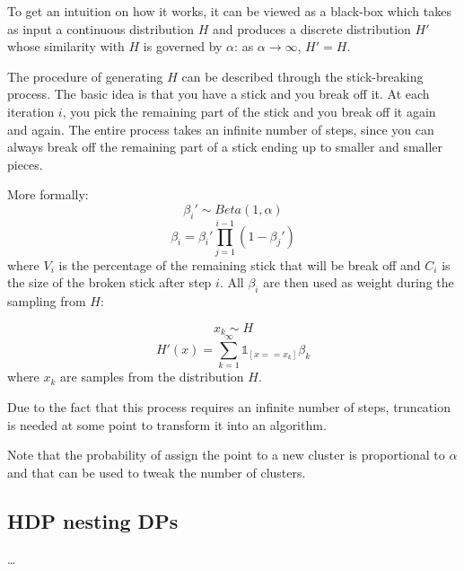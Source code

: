 To get an intuition on how it works, it can be viewed as a black-box
which takes as input a continuous distribution $H$ and produces a discrete distribution $H'$
whose similarity with $H$ is governed by $\alpha$: as $\alpha \to \infty$, $H' = H$.

The procedure of generating $H$ can be described through the stick-breaking process.
The basic idea is that you have a stick and you break off it.
At each iteration $i$, you pick the remaining part of the stick and you break off it again and again.
The entire process takes an infinite number of steps, since you can always break off the remaining part
of a stick ending up to smaller and smaller pieces.

More formally:
\begin{equation*}
    \beta_i' \sim Beta(1, \alpha)
\end{equation*}
\begin{equation*}
    \beta_i = \beta_i' \prod_{j=1}^{i-1} (1 - \beta_j')
\end{equation*}
where $V_i$ is the percentage of the remaining stick that will be break off
and $C_i$ is the size of the broken stick after step $i$.
All $\beta_i$ are then used as weight during the sampling from $H$:

\begin{equation*}
    x_k \sim H
\end{equation*}
\begin{equation*}
    H'(x) = \sum_{k=1}^{\infty} \mathbb{1}_{[x == x_k]} \beta_k
\end{equation*}
where $x_k$ are samples from the distribution $H$.

Due to the fact that this process requires an infinite number of steps,
truncation is needed at some point to transform it into an algorithm.

Note that the probability of assign the point to a new cluster
is proportional to $\alpha$ and that can be used to tweak the number of clusters.

\subsection{HDP nesting DPs}
\dots